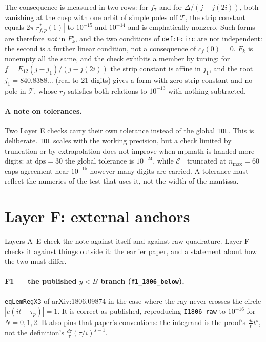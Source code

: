 \documentclass[11pt]{article}
\newcommand{\code}[1]{\texttt{#1}}
\begin{document}
The consequence is measured in two rows: for $f_7$ and for $\Delta/(j-j(2i))$, both vanishing at
the cusp with one orbit of simple poles off $\mathcal T$, the strip constant equals
$2\pi|r^*_{f,p}(1)|$ to $10^{-15}$ and $10^{-14}$ and is emphatically nonzero. Such forms are
therefore \emph{not} in $F_k^\circ$, and the two conditions of \code{def:Fcirc} are not
independent: the second is a further linear condition, not a consequence of $c_f(0)=0$.
$F_k^\circ$ is nonempty all the same, and the check exhibits a member by tuning: for
$f=E_{12}(j-j_1)/(j-j(2i))$ the strip constant is affine in $j_1$, and the root
$j_1=840.8388\ldots$ (real to $21$ digits) gives a form with zero strip constant and no pole in
$\mathcal T$, whose $r_f$ satisfies both relations to $10^{-13}$ with nothing subtracted.

\paragraph{A note on tolerances.} Two Layer E checks carry their own tolerance instead of the
global \code{TOL}. This is deliberate. \code{TOL} scales with the working precision, but a
check limited by truncation or by extrapolation does not improve when mpmath is handed more
digits: at $\mathrm{dps}=30$ the global tolerance is $10^{-24}$, while $\mathcal E^+$ truncated
at $n_{\max}=60$ caps agreement near $10^{-15}$ however many digits are carried. A tolerance
must reflect the numerics of the test that uses it, not the width of the mantissa.

\section{Layer F: external anchors}

Layers A--E check the note against itself and against raw quadrature. Layer F checks it against
things outside it: the earlier paper, and a statement about how the two must differ.

\paragraph{F1 --- the published $y<B$ branch (\code{f1\_1806\_below}).}
\code{eqLemRegX3} of arXiv:1806.09874 in the case where the ray never crosses the circle
$|e(it-\tau_p)|=1$. It is correct as published, reproducing \code{I1806\_raw} to $10^{-16}$ for
$N=0,1,2$. It also pins that paper's conventions: the integrand is the proof's
$\tfrac{dt}{t}t^{s}$, not the definition's $\tfrac{d\tau}{\tau}(\tau/i)^{s-1}$.
\end{document}
